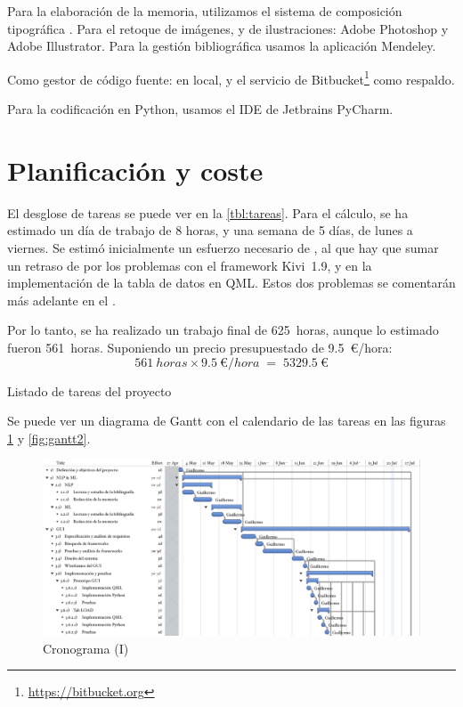 Para la elaboración de la memoria, utilizamos el sistema de composición tipográfica \XeLaTeX. Para el retoque de imágenes, y de ilustraciones: Adobe Photoshop y Adobe Illustrator. Para la gestión bibliográfica usamos la aplicación Mendeley.

Como gestor de código fuente:  en local, y el servicio de Bitbucket\footnote{\url{https://bitbucket.org}} como respaldo.

Para la codificación en Python, usamos el IDE de Jetbrains PyCharm.

\section{Planificación y coste}

El desglose de tareas se puede ver en la \autoref{tbl:tareas}. Para el cálculo, se ha estimado un día de trabajo de 8 horas, y una semana de 5 días, de lunes a viernes. Se estimó inicialmente un esfuerzo necesario de , al que hay que sumar un retraso de  por los problemas con el framework Kivi~1.9, y en la implementación de la tabla de datos en QML. Estos dos problemas se comentarán más adelante en el .

Por lo tanto, se ha realizado un trabajo final de \SI{625}{horas}, aunque lo estimado fueron \SI{561}{horas}. Suponiendo un precio presupuestado de \SI{9.5}{€/hora}:
\[
\SI{561}{horas} \times \SI{9.5}{€/hora} \; = \; \SI{5329.5}{€} 
\]

\begin{table}[htbp]
\centering
{}
\caption{Listado de tareas del proyecto}
\label{tbl:tareas}
\end{table}

Se puede ver un diagrama de Gantt con el calendario de las tareas en las figuras \ref{fig:gantt1} y \ref{fig:gantt2}.

\begin{landscape}
\begin{figure}[htbp]
\centering
\vspace*{0.6cm}
\includegraphics[width=24cm]{gantt1.pdf}
\caption{Cronograma (I)}
\label{fig:gantt1}
\end{figure}
\end{landscape}

